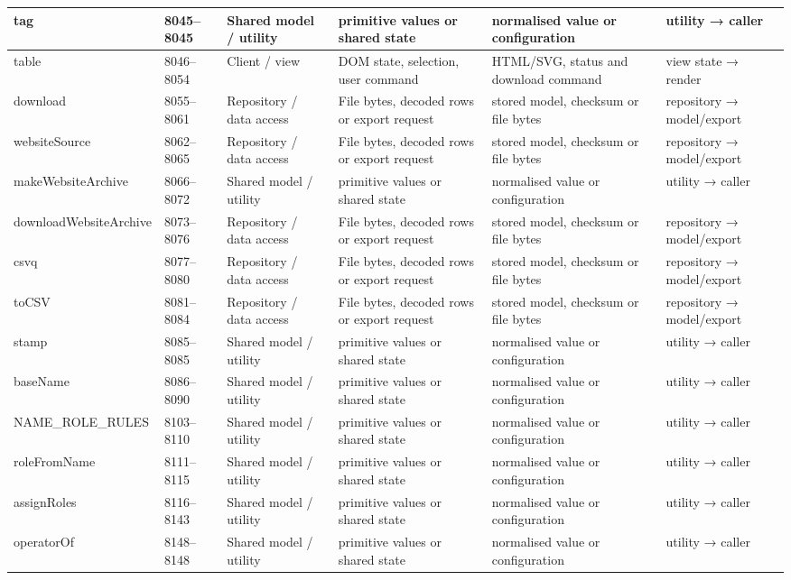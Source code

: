 \begin{landscape}
\begin{longtable}{@{}p{3.2cm}p{1.45cm}p{2.7cm}p{4.0cm}p{4.0cm}p{3.0cm}@{}}
tag & 8045--8045 & Shared model / utility & primitive values or shared state & normalised value or configuration & utility → caller \\\hline
table & 8046--8054 & Client / view & DOM state, selection, user command & HTML/SVG, status and download command & view state → render \\\hline
download & 8055--8061 & Repository / data access & File bytes, decoded rows or export request & stored model, checksum or file bytes & repository → model/export \\\hline
websiteSource & 8062--8065 & Repository / data access & File bytes, decoded rows or export request & stored model, checksum or file bytes & repository → model/export \\\hline
makeWebsiteArchive & 8066--8072 & Shared model / utility & primitive values or shared state & normalised value or configuration & utility → caller \\\hline
downloadWebsiteArchive & 8073--8076 & Repository / data access & File bytes, decoded rows or export request & stored model, checksum or file bytes & repository → model/export \\\hline
csvq & 8077--8080 & Repository / data access & File bytes, decoded rows or export request & stored model, checksum or file bytes & repository → model/export \\\hline
toCSV & 8081--8084 & Repository / data access & File bytes, decoded rows or export request & stored model, checksum or file bytes & repository → model/export \\\hline
stamp & 8085--8085 & Shared model / utility & primitive values or shared state & normalised value or configuration & utility → caller \\\hline
baseName & 8086--8090 & Shared model / utility & primitive values or shared state & normalised value or configuration & utility → caller \\\hline
NAME\_ROLE\_RULES & 8103--8110 & Shared model / utility & primitive values or shared state & normalised value or configuration & utility → caller \\\hline
roleFromName & 8111--8115 & Shared model / utility & primitive values or shared state & normalised value or configuration & utility → caller \\\hline
assignRoles & 8116--8143 & Shared model / utility & primitive values or shared state & normalised value or configuration & utility → caller \\\hline
operatorOf & 8148--8148 & Shared model / utility & primitive values or shared state & normalised value or configuration & utility → caller \\\hline

\end{longtable}
\end{landscape}
